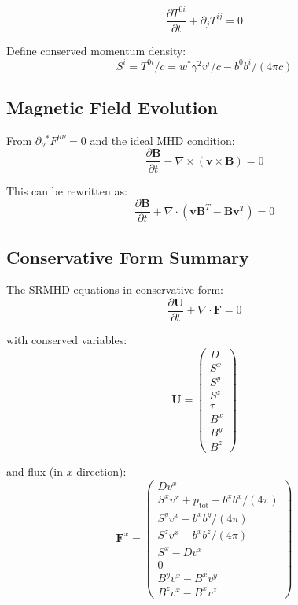\documentclass[12pt,a4paper]{article}
\begin{document}
\begin{equation}
\frac{\partial T^{0i}}{\partial t} + \partial_j T^{ij} = 0
\label{eq:momentum_cons_1}
\end{equation}

Define conserved momentum density:
\begin{equation}
S^i = T^{0i}/c = w^* \gamma^2 v^i/c - b^0 b^i/(4\pi c)
\label{eq:Si_def}
\end{equation}

\subsection{Magnetic Field Evolution}

From $\partial_\nu {}^*F^{\mu\nu} = 0$ and the ideal MHD condition:
\begin{equation}
\frac{\partial \bm{B}}{\partial t} - \nabla \times (\bm{v} \times \bm{B}) = 0
\label{eq:induction_eq}
\end{equation}

This can be rewritten as:
\begin{equation}
\frac{\partial \bm{B}}{\partial t} + \nabla \cdot (\bm{v}\bm{B}^T - \bm{B}\bm{v}^T) = 0
\label{eq:induction_conservative}
\end{equation}

\subsection{Conservative Form Summary}

The SRMHD equations in conservative form:
\begin{equation}
\frac{\partial \bm{U}}{\partial t} + \nabla \cdot \bm{F} = 0
\label{eq:conservative_form}
\end{equation}

with conserved variables:
\begin{equation}
\bm{U} = \begin{pmatrix} D \\ S^x \\ S^y \\ S^z \\ \tau \\ B^x \\ B^y \\ B^z \end{pmatrix}
\label{eq:conserved_variables}
\end{equation}

and flux (in $x$-direction):
\begin{equation}
\bm{F}^x = \begin{pmatrix}
D v^x \\
S^x v^x + p_\text{tot} - b^x b^x/(4\pi) \\
S^y v^x - b^x b^y/(4\pi) \\
S^z v^x - b^x b^z/(4\pi) \\
S^x - D v^x \\
0 \\
B^y v^x - B^x v^y \\
B^z v^x - B^x v^z
\end{pmatrix}
\label{eq:flux_x}
\end{equation}
\end{document}
